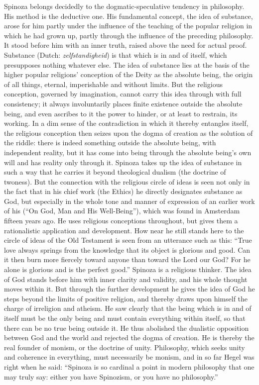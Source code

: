 \documentclass[12pt]{book}
\newcommand{\opage}[1]{\marginnote{\footnotesize\textit{[#1]}}}
\begin{document}
Spinoza belongs decidedly to the dogmatic-speculative tendency in philosophy. His
method is the deductive one. His fundamental concept, the idea of substance, arose
for him partly under the influence of the teaching of the popular religion in which
he had grown up, partly through the influence of the preceding philosophy. It stood
before him with an inner truth, raised above the need for \opage{7}actual proof.
Substance (Dutch: \textit{zelfstandigheid}) is that which is in and of itself, which
presupposes nothing whatever else. The idea of substance lies at the basis of the
higher popular religions' conception of the Deity as the absolute being, the origin
of all things, eternal, imperishable and without limits. But the religious
conception, governed by imagination, cannot carry this idea through with full
consistency; it always involuntarily places finite existence outside the absolute
being, and even ascribes to it the power to hinder, or at least to restrain, its
working. In a dim sense of the contradiction in which it thereby entangles itself,
the religious conception then seizes upon the dogma of creation as the solution of
the riddle: there is indeed something outside the absolute being, with independent
reality, but it has come into being through the absolute being's own will and has
reality only through it. Spinoza takes up the idea of substance in such a way that
he carries it beyond theological dualism (the doctrine of twoness). But the
connection with the religious circle of ideas is seen not only in the fact that in
his chief work (the Ethics) he directly designates substance as God, but especially
in the whole tone and manner of expression of an earlier work of his (``On God, Man
and His Well-Being''), which was found in Amsterdam fifteen years ago. He uses
religious conceptions throughout, but gives them a rationalistic application and
development. How near he still stands here to the circle of ideas of the Old
Testament is seen from an utterance such as this: ``True love always springs from
the knowledge that its object is glorious and good. Can it then burn more fiercely
toward \opage{8}anyone than toward the Lord our God? For he alone is glorious and is
the perfect good.'' Spinoza is a religious thinker. The idea of God stands before
him with inner clarity and validity, and his whole thought moves within it. But
through the further development he gives the idea of God he steps beyond the limits
of positive religion, and thereby draws upon himself the charge of irreligion and
atheism. He saw clearly that the being which is in and of itself must be the only
being and must contain everything within itself, so that there can be no true being
outside it. He thus abolished the dualistic opposition between God and the world and
rejected the dogma of creation. He is thereby the real founder of monism, or the
doctrine of unity. Philosophy, which seeks unity and coherence in everything, must
necessarily be monism, and in so far Hegel was right when he said: ``Spinoza is so
cardinal a point in modern philosophy that one may truly say: either you have
Spinozism, or you have no philosophy.''
\end{document}
